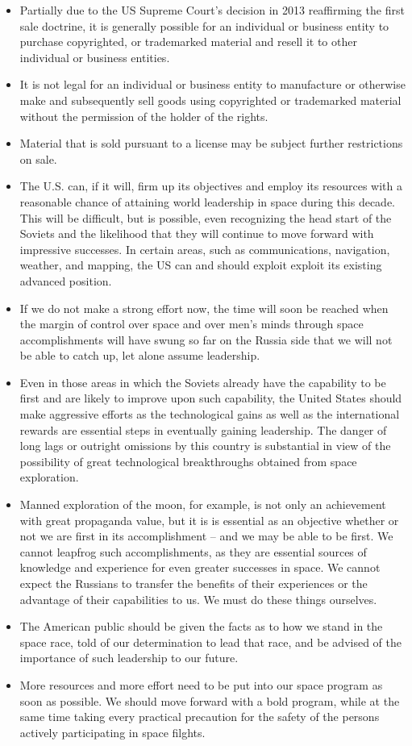 \documentclass[letterpaper,11pt]{texMemo}
\begin{document}
\begin{itemize}
 \item Partially due to the US Supreme Court's decision in 2013 reaffirming the first sale doctrine, it is generally possible for an individual or business entity to purchase copyrighted, or trademarked material and resell it to other individual or business entities.
 \item It is not legal for an individual or business entity to manufacture or otherwise make and subsequently sell goods using copyrighted or trademarked material without the permission of the holder of the rights.
 \item Material that is sold pursuant to a license may be subject further restrictions on sale.
 \item The U.S. can, if it will, firm up its objectives and employ its resources with a reasonable chance of attaining world leadership in space during this decade.  This will be difficult, but is possible, even recognizing the head start of the Soviets and the likelihood that they will continue to move forward with impressive successes.  In certain areas, such as communications, navigation, weather, and mapping, the US can and should exploit exploit its existing advanced position.
 \item If we do not make a strong effort now, the time will soon be reached when the margin of control over space and over men's minds through space accomplishments will have swung so far on the Russia side that we will not be able to catch up, let alone assume leadership.
 \item Even in those areas in which the Soviets already have the capability to be first and are likely to improve upon such capability, the United States should make aggressive efforts as the technological gains as well as the international rewards are essential steps in eventually gaining leadership.  The danger of long lags or outright omissions by this country is substantial in view of the possibility of great technological breakthroughs obtained from space exploration.
 \item Manned exploration of the moon, for example, is not only an achievement with great propaganda value, but it is is essential as an objective whether or not we are first in its accomplishment -- and we may be able to be first.  We cannot leapfrog such accomplishments, as they are essential sources of knowledge and experience for even greater successes in space.  We cannot expect the Russians to transfer the benefits of their experiences or the advantage of their capabilities to us.  We must do these things ourselves.
 \item The American public should be given the facts as to how we stand in the space race, told of our determination to lead that race, and be advised of the importance of such leadership to our future.
 \item More resources and more effort need to be put into our space program as soon as possible.  We should move forward with a bold program, while at the same time taking every practical precaution for the safety of the persons actively participating in space filghts.
\end{itemize}
\end{document}
